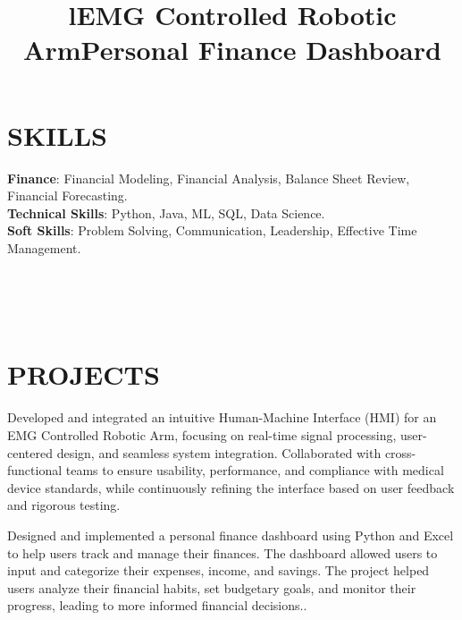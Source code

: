 \documentclass[margin]{res}
\begin{document}
\begin{resume}
\section{SKILLS}

\textbf{Finance}: Financial Modeling, Financial Analysis, Balance Sheet Review, Financial Forecasting.
\\
\textbf{Technical Skills}: Python, Java, ML, SQL, Data Science.
\\
\textbf{Soft Skills}: Problem Solving, Communication, Leadership, Effective Time Management.
\\

\begin{format}
\title{l}\\
\\
\body\\
\end{format}

\section{PROJECTS}
\title{\textbf{EMG Controlled Robotic Arm}}
\begin{position}
Developed and integrated an intuitive Human-Machine Interface (HMI) for an EMG Controlled Robotic Arm, focusing on real-time signal processing, user-centered design, and seamless system integration. Collaborated with cross-functional teams to ensure usability, performance, and compliance with medical device standards, while continuously refining the interface based on user feedback and rigorous testing.
\end{position}

\title{\textbf{Personal Finance Dashboard}}
\begin{position}
Designed and implemented a personal finance dashboard using Python and Excel to help users track and manage their finances. The dashboard allowed users to input and categorize their expenses, income, and savings. The project helped users analyze their financial habits, set budgetary goals, and monitor their progress, leading to more informed financial decisions..
\end{position}


\end{resume}
\end{document}
